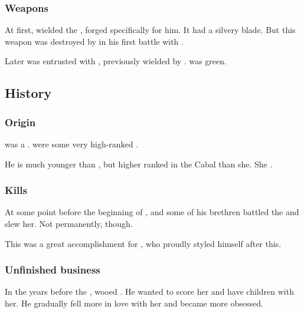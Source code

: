 \subsubsection{Weapons}
\index{\Turishah}
At first, \Teshrial{} wielded the  \Turishah, forged specifically for him. 
It had a silvery blade. 
But this weapon was destroyed by \QuessanthIshnaruchaefir{} in his first battle with \Teshrial. 

\index{\Ossiraith}
Later \Teshrial{} was entrusted with \Ossiraith, previously wielded by \Menessiaraid. 
\Ossiraith{} was green. 









\subsection{History}





\subsubsection{Origin}
\Teshrial{} was a \ketheran. 
 were some very high-ranked \resphain. 

He is much younger than , but higher ranked in the Cabal than she. 
She .





\subsubsection{Kills \Zessuruch}
At some point before the beginning of \emph{\TwilightAngelRemember{}}, \Teshrial and some of his brethren battled the \dragon {} and slew her. 
Not permanently, though. 

This was a great accomplishment for \Teshrial, who proudly styled himself  after this. 






\subsubsection{Unfinished business}
In the years before the \thirdbanewar, \Teshrial wooed . 
He wanted to score her and have children with her. 
He gradually fell more in love with her and became more obsessed. 

